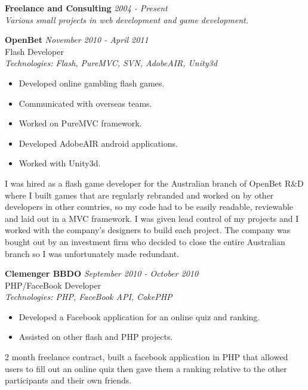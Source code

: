 \documentclass[a4paper,10pt]{article}
\begin{document}
\vspace{1em}

\textbf{Freelance and Consulting} \hfill \textit{2004 - Present} \\
\textit{Various small projects in web development and game development.}

\vspace{1em}

\textbf{OpenBet} \hfill \textit{November 2010 - April 2011} \\
Flash Developer \\
\textit{Technologies: Flash, PureMVC, SVN, AdobeAIR, Unity3d}
\begin{itemize}
    \item Developed online gambling flash games.
    \item Communicated with overseas teams.
    \item Worked on PureMVC framework.
    \item Developed AdobeAIR android applications.
    \item Worked with Unity3d.
\end{itemize}

I was hired as a flash game developer for the Australian branch of OpenBet R\&D where I built games that are regularly rebranded and worked on by other developers in other countries, so my code had to be easily readable, reviewable and laid out in a MVC framework. I was given lead control of my projects and I worked with the company's designers to build each project. The company was bought out by an investment firm who decided to close the entire Australian branch so I was unfortunately made redundant.

\vspace{1em}

\textbf{Clemenger BBDO} \hfill \textit{September 2010 - October 2010} \\
PHP/FaceBook Developer \\
\textit{Technologies: PHP, FaceBook API, CakePHP}
\begin{itemize}
    \item Developed a Facebook application for an online quiz and ranking.
    \item Assisted on other flash and PHP projects.
\end{itemize}

2 month freelance contract, built a facebook application in PHP that allowed users to fill out an online quiz then gave them a ranking relative to the other participants and their own friends.
\end{document}

